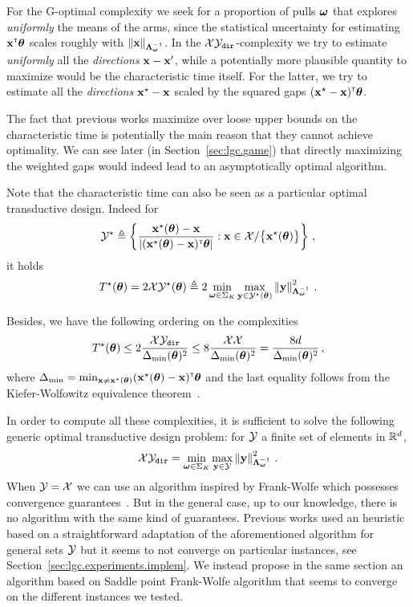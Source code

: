 For the G-optimal complexity we seek for a proportion of pulls ${\boldsymbol \omega}$ that explores \emph{uniformly} the means of the arms, since the statistical uncertainty for estimating ${\bf x}^\mathsf{\scriptscriptstyle T}{\boldsymbol \theta}$ scales roughly with $\left\lVert{\bf x}\right\rVert_{{\boldsymbol \Lambda}_{{\boldsymbol \omega}}^{-1}}$. In the $\mathcal{X}\mathcal{Y}_{\texttt{dir}}$-complexity we try to estimate \emph{uniformly} all the \emph{directions} ${\bf x}-{\bf x}'$, while a potentially more plausible quantity to maximize would be the characteristic time itself. For the latter, we try to estimate all the \emph{directions} ${\bf x}^\star - {\bf x}$ scaled by the squared gaps $({\bf x}^\star - {\bf x})^\mathsf{\scriptscriptstyle T}{\boldsymbol \theta}$. 

The fact that previous works maximize over loose upper bounds on the characteristic time is potentially the main reason that they cannot achieve optimality. We can see later (in Section~\ref{sec:lgc.game}) that directly maximizing the weighted gaps would indeed lead to an asymptotically optimal algorithm.

Note that the characteristic time can also be seen as a particular optimal transductive design. Indeed for 
\[
    \mathcal{Y}^\star \triangleq \left\{ \frac{{\bf x}^\star({\boldsymbol \theta})- {\bf x}}{\left|({\bf x}^\star({\boldsymbol \theta})- {\bf x})^\mathsf{\scriptscriptstyle T}{\boldsymbol \theta}\right|}: {\bf x}\in\mathcal{X}/\big\{{\bf x}^\star({\boldsymbol \theta})\big\}  \right\}\,,
\]
it holds
\[
    T^{\star}({\boldsymbol \theta}) = 2 \mathcal{X}\mathcal{Y}^\star({\boldsymbol \theta}) \triangleq 2 \min_{{\boldsymbol \omega}\in\Sigma_K} \max_{{\bf y}\in\mathcal{Y}^\star({\boldsymbol \theta})} \left\lVert{\bf y}\right\rVert_{{\boldsymbol \Lambda}_{{\boldsymbol \omega}}^{-1}}^2\,.
\]

Besides, we have the following ordering on the complexities
\begin{align}\label{eq:lgc.complexities}
    T^{\star}({\boldsymbol \theta}) \leq 2 \frac{\mathcal{X}\mathcal{Y}_{\texttt{dir}}}{\Delta_\text{min}({\boldsymbol \theta})^2}\leq 8 \frac{\mathcal{X}\mathcal{X}}{\Delta_\text{min}({\boldsymbol \theta})^2} = \frac{8d}{\Delta_\text{min}({\boldsymbol \theta})^2}\,,
\end{align}
where $\Delta_\text{min} = \min_{{\bf x}\neq{\bf x}^\star({\boldsymbol \theta})}({\bf x}^\star({\boldsymbol \theta})- {\bf x})^\mathsf{\scriptscriptstyle T}{\boldsymbol \theta}$ and the last equality follows from the Kiefer-Wolfowitz equivalence theorem~\citep{kiefer1959}. 


\begin{remark}
In order to compute all these complexities, it is sufficient to solve the following generic optimal transductive design problem: for $\mathcal{Y}$ a finite set of elements in $\mathbb{R}^d$,
\[
\mathcal{X}\mathcal{Y}_{\texttt{dir}}=\min_{{\boldsymbol \omega}\in\Sigma_K}\max_{{\bf y}\in\mathcal{Y}}\left\lVert{\bf y}\right\rVert^2_{{\boldsymbol \Lambda}_{{\boldsymbol \omega}}^{-1}}\,.
\]
When $\mathcal{Y}=\mathcal{X}$ we can use an algorithm inspired by Frank-Wolfe \citep{frank1956algorithm} which possesses convergence guarantees~\citep{atwood1969optimal,ahipasaoglu2008fw}. But in the general case, up to our knowledge, there is no algorithm with the same kind of guarantees. Previous works used an heuristic based on a straightforward adaptation of the aforementioned algorithm for general sets $\mathcal{Y}$ but it seems to not converge on particular instances, see Section~\ref{sec:lgc.experiments.implem}. We instead propose in the same section an algorithm based on Saddle point Frank-Wolfe algorithm that seems to converge on the different instances we tested.
\end{remark}

